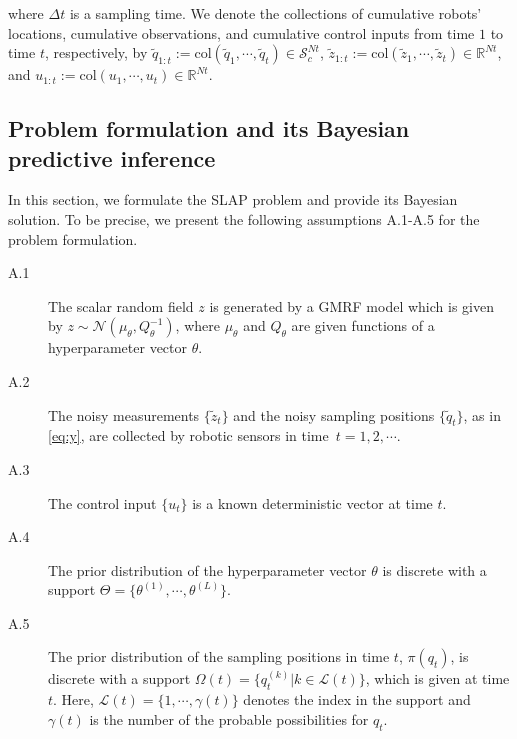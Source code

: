 \documentclass[letterpaper, 10 pt, conference]{ieeeconf}
\newcommand{\set}[1]{\{#1\}} \newcommand{\norm}[1]{\|#1\|}
\newcommand{\mc}[1]{\mathcal{#1}} \newcommand{\mb}[1]{\mathbf{#1}}
\newcommand{\Real}{\mathbb{R}}
\newcommand{\Normal}{\mc{N}}
\newcommand{\C}{\gamma}
\newcommand{\q}[1]{{q_{#1}}}
\newcommand{\qi}[2]{q^{(#1)}_{#2}}
\newcommand{\tildez}[1]{{\tilde{z}_{#1}}}
\begin{document}
where $\Delta t$ is a sampling time.
We denote the collections of cumulative robots' locations, cumulative observations, and cumulative control inputs from time $1$ to time $t$, respectively, by $\tilde{q}_{1:t} := \text{col} \left(\tilde{q}_{1},\cdots,\tilde{q}_{t} \right) \in \mc{S}^{ N t}_c$, $\tildez{1:t} := \text{col} \left(\tildez{1},\cdots,\tildez{t}\right) \in \Real^{N t}$, and $u_{1:t} := \text{col} \left(u_{1},\cdots,u_{t}\right)  \in \Real^{N t}$. 
 

\subsection{Problem formulation and its Bayesian  predictive inference}\label{subsec:solution}
In this section, we formulate the SLAP problem and  provide its  Bayesian solution.  To be precise, we present 
 the following assumptions A.1-A.5 for the problem formulation.
\begin{description}
\item[A.1] The scalar random field $z$ is generated by a GMRF model which is given by 
$z \sim \Normal(\mu_\theta,Q_\theta^{-1})$, where $\mu_\theta$ and $Q_{\theta}$ are given functions of a hyperparameter vector $\theta$.
\item[A.2] The noisy measurements $\set{ \tilde{z}_{t} }$ and the noisy sampling positions $\set{ \tilde{q}_{t} }$, as in \eqref{eq:y}, are collected by robotic sensors in time~$t = 1, 2, \cdots$.
\item[A.3] The control input $\{ u_{t} \}$ is a known deterministic  vector  at time $t$.
\item[A.4] The prior distribution of the hyperparameter vector $\theta$ is discrete with a support 
 $\Theta = \set{\theta^{(1)},\cdots,\theta^{(L)}}$. 
\item[A.5] The prior distribution of the sampling positions in time $t$, $\pi(\q{t})$, is discrete with a support
 $\Omega(t) = \set{\qi{k}{t}|k \in \mc{L}(t)}$, which is given at time $t$. Here, $\mc{L}(t)=\set{1,\cdots,\C(t)}$ denotes the index in the support and $\C(t)$ is the number of the probable possibilities for $\q{t}$.
\end{description}
\end{document}
